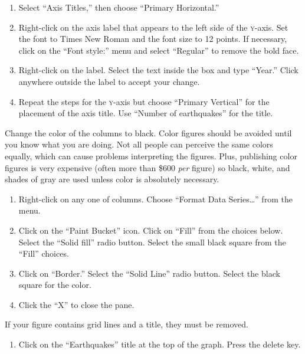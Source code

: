 \documentclass[12pt, hidelinks]{exam}
\newcommand*\axis[1]{{\scshape #1}-axis}
\begin{document}
\begin{questions}
\begin{enumerate}[resume]
	\item Select “Axis Titles,” then choose “Primary Horizontal.”

	\item Right-click on the axis label that appears to the left side of the \axis{y}. Set the font to Times New Roman and the font size to 12 points. If necessary, click on the “Font style:” menu and select “Regular” to remove the bold face.

	\item Right-click on the label. Select the text inside the box and type “Year.” Click anywhere outside the label to accept your change.

	\item Repeat the steps for the \axis{y} but choose “Primary Vertical” for the placement of the axis title. Use “Number of earthquakes” for the title. 

	
\end{enumerate}

Change the color of the columns to black. Color figures should be avoided until you know what you are doing. Not all people can perceive the same colors equally, which can cause problems interpreting the figures. Plus, publishing color figures is very expensive (often more than \$600 \emph{per} figure) so black, white, and shades of gray are used unless color is absolutely necessary. 

\begin{enumerate}[resume]
	\item Right-click on any one of columns. Choose “Format Data Series\dots” from the menu.
	
	\item Click on the “Paint Bucket” icon. Click on “Fill” from the choices below. Select the “Solid fill” radio button. Select the small black square from the “Fill” choices.
	
	\item Click on “Border.” Select the “Solid Line” radio button. Select the black square for the color.
	
	\item Click the “X” to close the pane.
	
\end{enumerate}

If your figure contains grid lines and a title, they must be removed.


\begin{enumerate}[resume]
	\item Click on the “Earthquakes” title at the top of the graph. Press the delete key.


\end{enumerate}
\end{questions}
\end{document}
